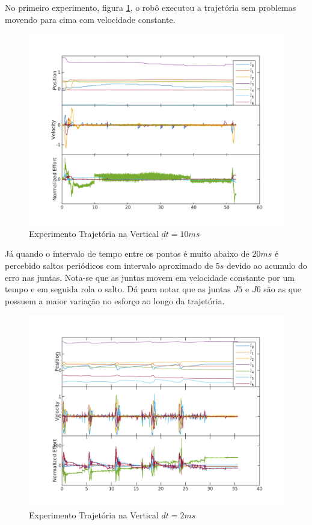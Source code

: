 No primeiro experimento, figura \ref{fig:moveUp1}, o robô executou a trajetória sem problemas movendo para cima com velocidade constante.

\begin{figure}[H]
    \centering
    \includegraphics[width=0.8\linewidth,trim={2cm 1cm 2cm 2cm}]{tex/figs/moveUp1stateEvalv70s10.png}
    \caption{Experimento Trajetória na Vertical $dt=10ms$ }
    \label{fig:moveUp1}
\end{figure}

Já quando o intervalo de tempo entre os pontos é muito abaixo de $20ms$ é percebido saltos periódicos com intervalo aproximado de $5s$ devido ao acumulo do erro nas juntas. Nota-se que as juntas movem em velocidade constante por um tempo e em seguida rola o salto. Dá para notar que as juntas $J5$ e $J6$ são as que possuem a maior variação no esforço ao longo da trajetória.

\begin{figure}[H]
    \centering
    \includegraphics[width=0.8\linewidth,trim={2cm 1cm 2cm 2cm}]{tex/figs/moveUp3stateEvalv70s50.png}
    \caption{Experimento Trajetória na Vertical $dt=2ms$ }
    \label{fig:moveUp3}
\end{figure}

